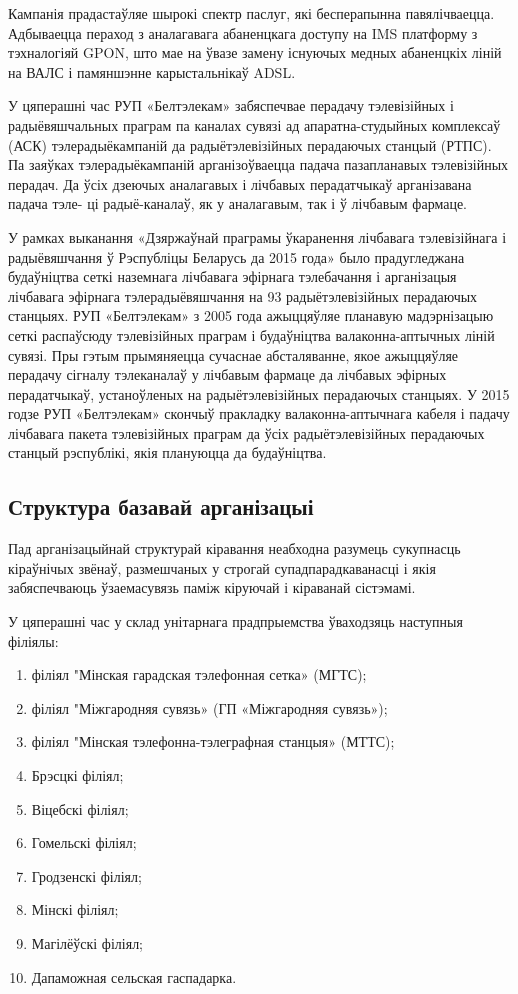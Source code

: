 Кампанія прадастаўляе шырокі спектр паслуг,
які бесперапынна павялічваецца.
Адбываецца пераход з аналагавага абаненцкага доступу на IMS платформу з тэхналогіяй GPON,
што мае на ўвазе замену існуючых медных абаненцкіх ліній на ВАЛС і памяншэнне карыстальнікаў ADSL.

У цяперашні час РУП «Белтэлекам» забяспечвае перадачу тэлевізійных
і радыёвяшчальных праграм па каналах сувязі ад апаратна-студыйных комплексаў (АСК) тэлерадыёкампаній
да радыётэлевізійных перадаючых станцый (РТПС).
Па заяўках тэлерадыёкампаній арганізоўваецца падача пазапланавых тэлевізійных перадач.
Да ўсіх дзеючых аналагавых і лічбавых перадатчыкаў арганізавана падача тэле- ці радыё-каналаў, як у аналагавым, так і ў лічбавым фармаце.

У рамках выканання «Дзяржаўнай праграмы ўкаранення лічбавага тэлевізійнага і радыёвяшчання ў Рэспубліцы Беларусь да 2015 года»
было прадугледжана будаўніцтва сеткі наземнага лічбавага эфірнага тэлебачання
і арганізацыя лічбавага эфірнага тэлерадыёвяшчання на 93 радыётэлевізійных перадаючых станцыях.
РУП «Белтэлекам» з 2005 года ажыццяўляе планавую мадэрнізацыю сеткі распаўсюду тэлевізійных праграм
і будаўніцтва валаконна-аптычных ліній сувязі.
Пры гэтым прымяняецца сучаснае абсталяванне, якое ажыццяўляе перадачу сігналу тэлеканалаў
у лічбавым фармаце да лічбавых эфірных перадатчыкаў, устаноўленых на радыётэлевізійных перадаючых станцыях.
У 2015 годзе РУП «Белтэлекам» скончыў пракладку валаконна-аптычнага кабеля і падачу лічбавага пакета тэлевізійных праграм
да ўсіх радыётэлевізійных перадаючых станцый рэспублікі, якія плануюцца да будаўніцтва.

\subsection{Структура базавай арганізацыі}
Пад арганізацыйнай структурай кіравання неабходна разумець сукупнасць кіраўнічых звёнаў,
размешчаных у строгай супадпарадкаванасці і якія забяспечваюць ўзаемасувязь паміж кіруючай і кіраванай сістэмамі.

У цяперашні час у склад унітарнага прадпрыемства ўваходзяць наступныя філіялы:
\begin{enumerate}
    \item філіял "Мінская гарадская тэлефонная сетка» (МГТС);
    \item філіял "Міжгародняя сувязь» (ГП «Міжгародняя сувязь»);
    \item філіял "Мінская тэлефонна-тэлеграфная станцыя» (МТТС);
    \item Брэсцкі філіял;
    \item Віцебскі філіял;
    \item Гомельскі філіял;
    \item Гродзенскі філіял;
    \item Мінскі філіял;
    \item Магілёўскі філіял;
    \item Дапаможная сельская гаспадарка.
\end{enumerate}

